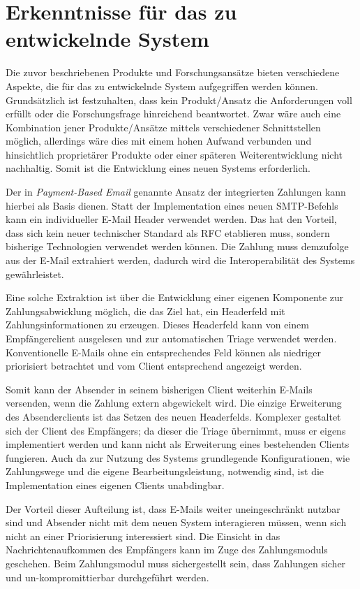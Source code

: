 
\section{Erkenntnisse für das zu entwickelnde System}
\label{Erkenntnisse_fuer_das_zu_entwickelnde_System}
Die zuvor beschriebenen Produkte und Forschungsansätze bieten verschiedene Aspekte, die für das zu entwickelnde System aufgegriffen werden können. Grundsätzlich ist festzuhalten, dass kein Produkt/Ansatz die Anforderungen voll erfüllt oder die Forschungsfrage hinreichend beantwortet. Zwar wäre auch eine Kombination jener Produkte/Ansätze mittels verschiedener Schnittstellen möglich, allerdings wäre dies mit einem hohen Aufwand verbunden und hinsichtlich proprietärer Produkte oder einer späteren Weiterentwicklung nicht nachhaltig. Somit ist die Entwicklung eines neuen Systems erforderlich.

Der in \textit{Payment-Based Email} genannte Ansatz der integrierten Zahlungen kann hierbei als Basis dienen. Statt der Implementation eines neuen SMTP-Befehls kann ein individueller E-Mail Header verwendet werden. Das hat den Vorteil, dass sich kein neuer technischer Standard als RFC etablieren muss, sondern bisherige Technologien verwendet werden können. Die Zahlung muss demzufolge aus der E-Mail extrahiert werden, dadurch wird die Interoperabilität des Systems gewährleistet. 

Eine solche Extraktion ist über die Entwicklung einer eigenen Komponente zur Zahlungsabwicklung möglich, die das Ziel hat, ein Headerfeld mit Zahlungsinformationen zu erzeugen. Dieses Headerfeld kann von einem Empfängerclient ausgelesen und zur automatischen Triage verwendet werden. Konventionelle E-Mails ohne ein entsprechendes Feld können als niedriger priorisiert betrachtet und vom Client entsprechend angezeigt werden.

Somit kann der Absender in seinem bisherigen Client weiterhin E-Mails versenden, wenn die Zahlung extern abgewickelt wird. Die einzige Erweiterung des Absenderclients ist das Setzen des neuen Headerfelds. Komplexer gestaltet sich der Client des Empfängers; da dieser die Triage übernimmt, muss er eigens implementiert werden und kann nicht als Erweiterung eines bestehenden Clients fungieren. Auch da zur Nutzung des Systems grundlegende Konfigurationen, wie Zahlungswege und die eigene Bearbeitungsleistung, notwendig sind, ist die Implementation eines eigenen Clients unabdingbar.

Der Vorteil dieser Aufteilung ist, dass E-Mails weiter uneingeschränkt nutzbar sind und Absender nicht mit dem neuen System interagieren müssen, wenn sich nicht an einer Priorisierung interessiert sind. Die Einsicht in das Nachrichtenaufkommen des Empfängers kann im Zuge des Zahlungsmoduls geschehen. Beim Zahlungsmodul muss sichergestellt sein, dass Zahlungen sicher und un-kompromittierbar durchgeführt werden.

